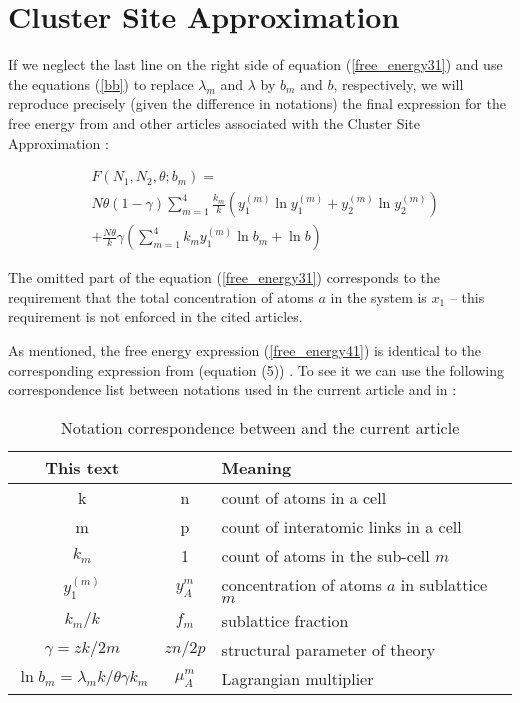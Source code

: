 \documentclass[12pt,abstract]{scrartcl}
\begin{document}
\section{Cluster Site Approximation}

If we neglect the last line on the right side of equation (\ref{free_energy31}) and use the equations (\ref{bb}) to replace 
$\lambda_m$ and $\lambda$ by $b_m$ and $b$, respectively, we will reproduce precisely (given the difference in notations) the final expression for the free energy from \cite{Oates1999} and other  articles associated with the Cluster Site Approximation \cite{Oates1999, zhang_oates2001, Yang1945, Yang1947, li1949quasi}:

\begin{equation}\label{free_energy41}
\begin{split}
&F(N_1, N_2, \theta; b_m)= \\
& N \theta(1- \gamma) \sum_{m = 1}^4  \frac{k_m}{k} ( y_1^{(m)} \ln y_1^{(m)} + y_2^{(m)} \ln y_2^{(m)} )\\
&+ \frac{N \theta}{k} \gamma ( \sum_{m=1}^4 k_m  y_1^{(m)} \ln b_m + \ln b)
\end{split}
\end{equation}

The omitted part of the  equation (\ref{free_energy31}) corresponds to the requirement that the total concentration of atoms $a$ in the system is $x_1$ -- this requirement is not enforced in the cited articles.

As mentioned, the free energy expression (\ref{free_energy41}) is identical to the corresponding expression from \cite{Oates1999} (equation (5)) .
To see it we can use the following correspondence list between notations  used in the current article and in \cite{Oates1999}:

\begin{table} [h]
\begin{center}
\caption{Notation  correspondence between \cite{Oates1999} and the current article\\
 }
\label{tab:table1}
\begin{tabular}{|c|c|l|}
\hline
\textbf{This text} &  \textbf{\cite{Oates1999}} & \textbf{Meaning} \\
			\hline
k & n & count of atoms in a cell\\
m & p & count of interatomic links in a cell\\
$k_m$ & 1 & count of atoms in the sub-cell $m$\\
$y_1^{(m)}$ & $y_A^m$ & concentration of atoms $a$ in sublattice $m$ \\
$k_m / k$ & $f_m$ &  sublattice fraction\\
$\gamma= zk / 2m$ & $zn / 2 p$ & structural parameter of theory\\
$\ln b_m = \lambda_m k / \theta \gamma k_m$ & $\mu_A^m$ & Lagrangian multiplier \\
\hline
\end{tabular}
\end{center}
\end{table}
\end{document}
